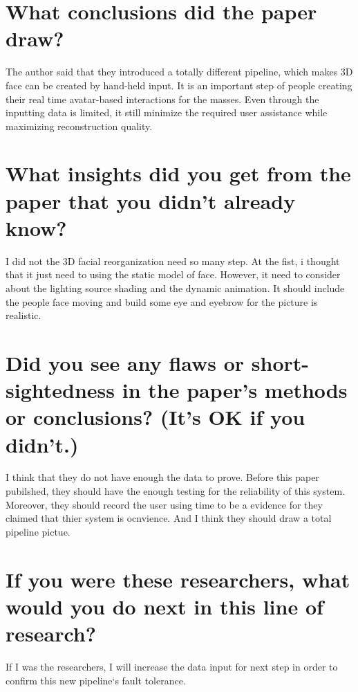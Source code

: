 \documentclass[12pt,a4paper,titlepage]{article}
\begin{document}
\section{What conclusions did the paper draw?}{
The author said that they introduced a totally different pipeline, which makes 3D face can be created by hand-held input. It is an important step of people creating their real time avatar-based interactions for the masses. Even through the inputting data is limited, it still minimize the required user assistance while maximizing reconstruction quality. 
}
\label{sec:q4sec}

\section{What insights did you get from the paper that you didn't already know?}{
I did not the 3D facial reorganization need so many step. At the fist, i thought that it just need to using the static model of face. However, it need to consider about the lighting source shading and the dynamic animation. It should include the people face moving and build some eye and eyebrow for the picture is realistic.
}
\label{sec:q5sec}

\section{Did you see any flaws or short-sightedness in the paper's methods or conclusions? (It's OK if you didn't.)}{
I think that they do not have enough the data to prove. Before this paper pubilshed, they should have the enough testing for the reliability of this system. Moreover, they should record the user using time to be a evidence for they claimed that thier system is ocnvience. And I think they should draw a total pipeline pictue. 

}
\label{sec:q6sec}

\section{If you were these researchers, what would you do next in this line of research?}{
If I was the researchers, I will increase the data input for next step in order to confirm this new pipeline‘s fault tolerance.
}
\label{sec:q7sec}
\newpage
\end{document}

